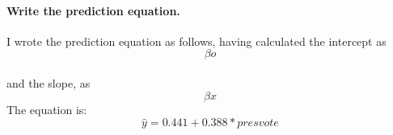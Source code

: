 \documentclass{article}
\begin{document}
\paragraph{Write the prediction equation.}
I wrote the prediction equation as follows, having calculated the intercept as 
\begin{equation}
	\beta o
\end{equation} 
\paragraph{}and the slope, as 
\begin{equation}
	\beta x
\end{equation}The equation is:
\begin{equation}
	\hat{y} = 0.441 + 0.388 * presvote
\end{equation}
\end{document}
